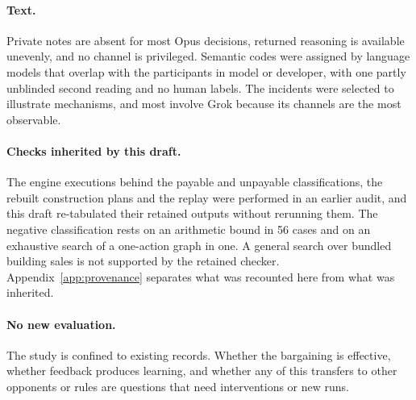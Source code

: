 \paragraph{Text.} Private notes are absent for most Opus decisions, returned reasoning is available unevenly, and no channel is privileged. Semantic codes were assigned by language models that overlap with the participants in model or developer, with one partly unblinded second reading and no human labels. The incidents were selected to illustrate mechanisms, and most involve Grok because its channels are the most observable.

\paragraph{Checks inherited by this draft.} The engine executions behind the payable and unpayable classifications, the rebuilt construction plans and the replay were performed in an earlier audit, and this draft re-tabulated their retained outputs without rerunning them. The negative classification rests on an arithmetic bound in 56 cases and on an exhaustive search of a one-action graph in one. A general search over bundled building sales is not supported by the retained checker. Appendix~\ref{app:provenance} separates what was recounted here from what was inherited.

\paragraph{No new evaluation.} The study is confined to existing records. Whether the bargaining is effective, whether feedback produces learning, and whether any of this transfers to other opponents or rules are questions that need interventions or new runs.
